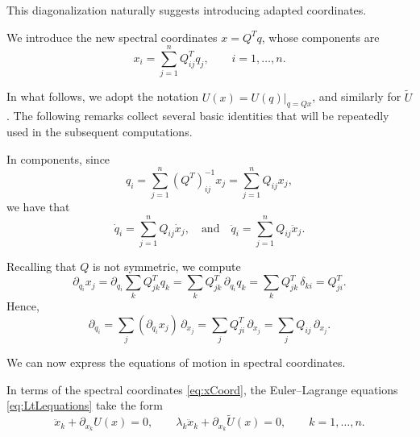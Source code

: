 \documentclass{rendiconti}
\begin{document}
This diagonalization naturally suggests introducing adapted coordinates.

\begin{definition}
We introduce the new spectral coordinates $x=Q^T q$, whose components are
\begin{equation}
\label{eq:xCoord}
x_i
=
\sum_{j=1}^n Q^T_{ij} q_j,
\qquad
i=1,\dots,n.
\end{equation}
\end{definition}
%
In what follows, we adopt the notation $U(x)=U(q)\vert_{q=Qx}$, and similarly for
$\widetilde U$. The following remarks collect several basic identities that will be repeatedly used in the subsequent computations.
%
\begin{remark}
\label{rem:calc1a}
In components, since 
\begin{equation}
\textstyle
q_i=\sum_{j=1}^n(Q^T)^{-1}_{ij} x_j=\sum_{j=1}^nQ_{ij} x_j,
\end{equation}
we have that 
\begin{equation}
\textstyle
\dot q_i=\sum_{j=1}^nQ_{ij} \dot x_j,
\quad\mbox{and}\quad
\ddot q_i=\sum_{j=1}^nQ_{ij} \ddot x_j.
\end{equation}
\end{remark}
%
\begin{remark}
\label{rem:calc2a}
Recalling that $Q$ is not symmetric, we compute
\begin{equation}
\textstyle
\partial_{q_i} x_j
=
\partial_{q_i}\sum_{k} Q^T_{jk} q_k
=
\sum_{k} Q^T_{jk}\, \partial_{q_i} q_k
=
\sum_{k} Q^T_{jk}\, \delta_{ki}
=
Q^T_{ji}.
\end{equation}
Hence,
\begin{equation}
\textstyle
\partial_{q_i}
=
\sum_j (\partial_{q_i} x_j)\, \partial_{x_j}
=
\sum_j Q^T_{ji}\, \partial_{x_j}
=
\sum_j Q_{ij}\, \partial_{x_j}.
\end{equation}
\end{remark}
%
We can now express the equations of motion in spectral coordinates.
%
\begin{proposition}
\label{eq:xEL}
 In terms of the spectral coordinates \eqref{eq:xCoord}, the Euler--Lagrange equations \eqref{eq:LtLequations} take the form
\begin{equation}
\label{eq:xEoM}
\ddot{x}_k + \partial_{x_k}U(x) = 0,
\qquad
\lambda_k \ddot{x}_k + \partial_{x_k} \widetilde U(x) = 0,
\qquad k = 1,\dots,n.
\end{equation}
\end{proposition}
%
\end{document}
